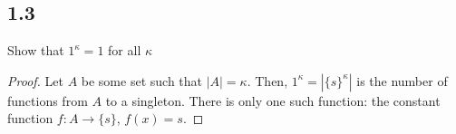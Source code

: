\subsection*{1.3} Show that $1^{\kappa} = 1 $ for all $\kappa$ 

\begin{proof}
Let $A$ be some set such that $|A| = \kappa$. Then, $1^\kappa = |\{s\}^\kappa|$ is the number of functions from $A$ to a singleton. There is only one such function: the constant function $f:A \rightarrow \{s\}$, $f(x) = s$.
\end{proof}

